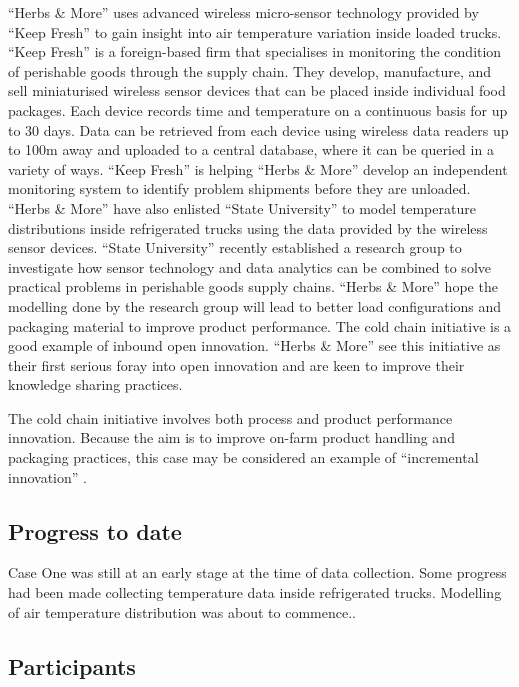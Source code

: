 \enquote{Herbs \& More} uses advanced wireless micro-sensor technology provided by \enquote{Keep Fresh} to gain insight into air temperature variation inside loaded trucks. \enquote{Keep Fresh} is a foreign-based firm that specialises in monitoring the condition of perishable goods through the supply chain. They develop, manufacture, and sell miniaturised wireless sensor devices that can be placed inside individual food packages. Each device records time and temperature on a continuous basis for up to 30 days. Data can be retrieved from each device using wireless data readers up to 100m away and uploaded to a central database, where it can be queried in a variety of ways. \enquote{Keep Fresh} is helping \enquote{Herbs \& More} develop an independent monitoring system to identify problem shipments before they are unloaded. \enquote{Herbs \& More} have also enlisted \enquote{State University} to model temperature distributions inside refrigerated trucks using the data provided by the wireless sensor devices. \enquote{State University} recently established a research group to investigate how sensor technology and data analytics can be combined to solve practical problems in perishable goods supply chains. \enquote{Herbs \& More} hope the modelling done by the research group will lead to better load configurations and packaging material to improve product performance. The cold chain initiative is a good example of inbound open innovation. \enquote{Herbs \& More} see this initiative as their first serious foray into open innovation and are keen to improve their knowledge sharing practices. \medskip

The cold chain initiative involves both process and product performance innovation. Because the aim is to improve on-farm product handling and packaging practices, this case may be considered an example of \enquote{incremental innovation} \citep{henderson1990architectural}. \medskip

\subsection{Progress to date}

Case One was still at an early stage at the time of data collection. Some progress had been made collecting temperature data inside refrigerated trucks. Modelling of air temperature distribution was about to commence.. 

\subsection{Participants}

